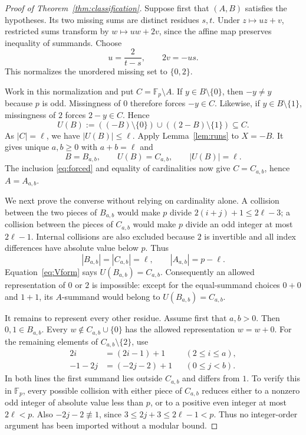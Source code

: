 \documentclass[11pt]{article}
\newcommand{\Fp}{\mathbb F_p}
\begin{document}
\begin{proof}[Proof of Theorem~\ref{thm:classification}]
Suppose first that $(A,B)$ satisfies the hypotheses.  Its two missing sums
are distinct residues $s,t$.  Under $z\mapsto uz+v$, restricted sums
transform by $w\mapsto uw+2v$, since the affine map preserves inequality
of summands.  Choose
\[
 u=\frac{2}{t-s},\qquad 2v=-us.
\]
This normalizes the unordered missing set to $\{0,2\}$.

Work in this normalization and put $C=\Fp\setminus A$.  If
$y\in B\setminus\{0\}$, then $-y\ne y$ because $p$ is odd.  Missingness
of $0$ therefore forces $-y\in C$.  Likewise, if
$y\in B\setminus\{1\}$, missingness of $2$ forces $2-y\in C$.  Hence
\begin{equation}\label{eq:forced}
 U(B):=((-B)\setminus\{0\})\cup((2-B)\setminus\{1\})\subseteq C.
\end{equation}
As $|C|=\ell$, we have $|U(B)|\leq\ell$.  Apply
Lemma~\ref{lem:runs} to $X=-B$.  It gives unique $a,b\geq0$ with
$a+b=\ell$ and
\[
 B=B_{a,b},\qquad U(B)=C_{a,b},\qquad |U(B)|=\ell.
\]
The inclusion \eqref{eq:forced} and equality of cardinalities now give
$C=C_{a,b}$, hence $A=A_{a,b}$.

We next prove the converse without relying on cardinality alone.  A collision
between the two pieces of $B_{a,b}$ would make $p$ divide
$2(i+j)+1\leq2\ell-3$; a collision between the pieces of $C_{a,b}$ would
make $p$ divide an odd integer at most $2\ell-1$.  Internal collisions are
also excluded because $2$ is invertible and all index differences have
absolute value below $p$.  Thus
\[
 |B_{a,b}|=|C_{a,b}|=\ell,
 \qquad |A_{a,b}|=p-\ell.
\]
Equation~\eqref{eq:Vform} says $U(B_{a,b})=C_{a,b}$.  Consequently an
allowed representation of $0$ or $2$ is impossible: except for the
equal-summand choices $0+0$ and $1+1$, its $A$-summand would belong to
$U(B_{a,b})=C_{a,b}$.

It remains to represent every other residue.  Assume first that $a,b>0$.
Then $0,1\in B_{a,b}$.  Every
$w\notin C_{a,b}\cup\{0\}$ has the allowed representation $w=w+0$.
For the remaining elements of $C_{a,b}\setminus\{2\}$, use
\begin{align*}
 2i&=(2i-1)+1 &&(2\leq i\leq a),\\
 -1-2j&=(-2j-2)+1 &&(0\leq j<b).
\end{align*}
In both lines the first summand lies outside $C_{a,b}$ and differs from
$1$.  To verify this in $\Fp$, every possible collision with either piece
of $C_{a,b}$ reduces either to a nonzero odd integer of absolute value less
than $p$, or to a positive even integer at most $2\ell<p$.  Also
$-2j-2\not\equiv1$, since $3\leq2j+3\leq2\ell-1<p$.  Thus no integer-order
argument has been imported without a modular bound.


\end{proof}
\end{document}
